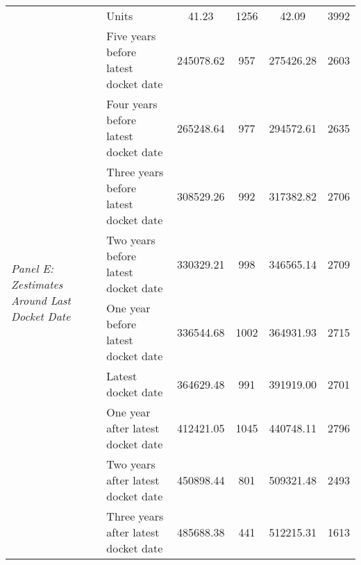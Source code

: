 \begin{tabular}{llcccc}
 & Units & 41.23 & 1256 & 42.09 & 3992 \\
\cline{1-6}
\multirow[c]{9}{4cm}{\textit{Panel E: Zestimates Around Last Docket Date}} & Five years before latest docket date & 245078.62 & 957 & 275426.28 & 2603 \\
 & Four years before latest docket date & 265248.64 & 977 & 294572.61 & 2635 \\
 & Three years before latest docket date & 308529.26 & 992 & 317382.82 & 2706 \\
 & Two years before latest docket date & 330329.21 & 998 & 346565.14 & 2709 \\
 & One year before latest docket date & 336544.68 & 1002 & 364931.93 & 2715 \\
 & Latest docket date & 364629.48 & 991 & 391919.00 & 2701 \\
 & One year after latest docket date & 412421.05 & 1045 & 440748.11 & 2796 \\
 & Two years after latest docket date & 450898.44 & 801 & 509321.48 & 2493 \\
 & Three years after latest docket date & 485688.38 & 441 & 512215.31 & 1613 \\
\cline{1-6}
\bottomrule
\end{tabular}
